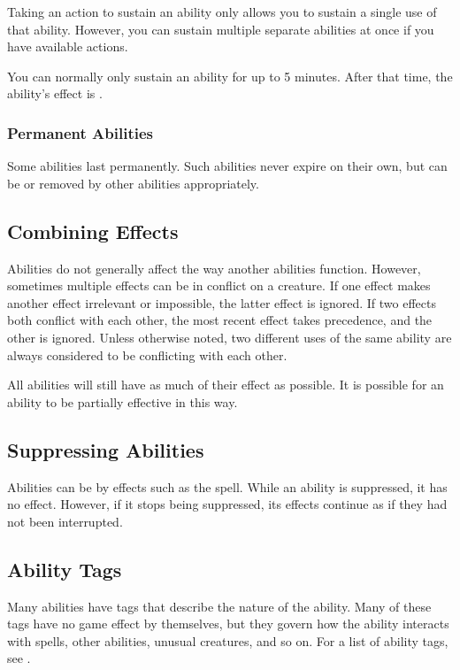            Taking an action to sustain an ability only allows you to sustain a single use of that ability.
            However, you can sustain multiple separate abilities at once if you have available actions.

            You can normally only sustain an ability for up to 5 minutes.
            After that time, the ability's effect is .

        \subsubsection{Permanent Abilities}
            Some abilities last permanently.
            Such abilities never expire on their own, but can be  or removed by other abilities appropriately.

    \subsection{Combining Effects}
        Abilities do not generally affect the way another abilities function.
        However, sometimes multiple effects can be in conflict on a creature.
        If one effect makes another effect irrelevant or impossible, the latter effect is ignored.
        If two effects both conflict with each other, the most recent effect takes precedence, and the other is ignored.
        Unless otherwise noted, two different uses of the same ability are always considered to be conflicting with each other.

        All abilities will still have as much of their effect as possible.
        It is possible for an ability to be partially effective in this way.

    \subsection{Suppressing Abilities}\label{Suppressing Abilities}
        Abilities can be  by effects such as the  spell.
        While an ability is suppressed, it has no effect.
        However, if it stops being suppressed, its effects continue as if they had not been interrupted.

    \subsection{Ability Tags}
        Many abilities have tags that describe the nature of the ability.
        Many of these tags have no game effect by themselves, but they govern how the ability interacts with spells, other abilities, unusual creatures, and so on.
        For a list of ability tags, see .

